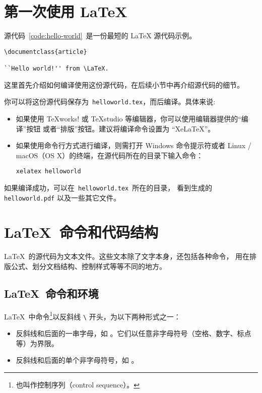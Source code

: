 \section{第一次使用 \LaTeX}\label{sec:run}

源代码~\ref{code:hello-world}~是一份最短的 \LaTeX{} 源代码示例。

\begin{sourcecode}[htp]
\begin{Verbatim}
\documentclass{article}

``Hello world!'' from \LaTeX.

\end{Verbatim}
\caption{\LaTeX\ 的一个最简单的源代码示例。}\label{code:hello-world}
\end{sourcecode}

这里首先介绍如何编译使用这份源代码，在后续小节中再介绍源代码的细节。

你可以将这份源代码保存为~\texttt{helloworld.tex}，而后编译。具体来说:
\begin{itemize}
  \item 如果使用 \TeX works! 或 \TeX studio 等编辑器，你可以使用编辑器提供的“编译”按钮
  或者“排版”按钮。建议将编译命令设置为 “XeLaTeX”。
  \item 如果使用命令行方式进行编译，则需打开 Windows 命令提示符或者 Linux / macOS（OS X）的终端，在源代码所在的目录下输入命令：
\begin{verbatim}
xelatex helloworld
\end{verbatim}
\end{itemize}

如果编译成功，可以在~\texttt{helloworld.tex}~所在的目录，
看到生成的 \texttt{helloworld.pdf} 以及一些其它文件。

\section{\LaTeX\ 命令和代码结构}\label{sec:src}

\LaTeX\ 的源代码为文本文件。这些文本除了文字本身，还包括各种命令，
用在排版公式、划分文档结构、控制样式等等不同的地方。

\subsection{\LaTeX\ 命令和环境}\label{subsec:cmds}

\LaTeX\ 中命令\footnote{也叫作控制序列（control sequence）。}以反斜线 \texttt{\textbackslash} 开头，为以下两种形式之一：
\begin{itemize}
  \item 反斜线和后面的一串字母，如 。它们以任意非字母符号（空格、数字、标点等）为界限。
  \item 反斜线和后面的单个非字母符号，如 \cmd{\$}。
\end{itemize}

